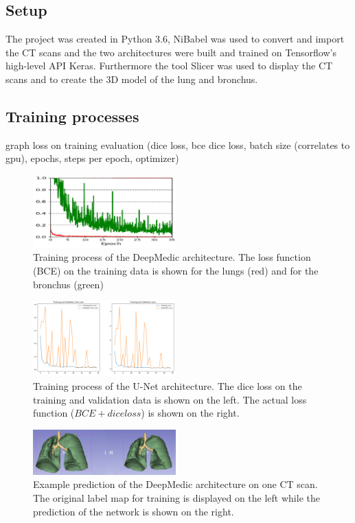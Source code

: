 
\subsection{Setup}

The project was created in Python 3.6, NiBabel was used to convert and import the CT scans and the two architectures were built and trained on Tensorflow's high-level API Keras. Furthermore the tool Slicer was used to display the CT scans and to create the 3D model of the lung and bronchus.

\subsection{Training processes}
graph loss on training evaluation (dice loss, bce dice loss, batch size (correlates to gpu), epochs, steps per epoch, optimizer)

\begin{figure}[h!]
	\includegraphics[width=0.49\textwidth, angle=0]{files/deepmedictrain.png}
	\caption{Training process of the DeepMedic architecture. The loss function (BCE) on the training data is shown for the lungs (red) and for the bronchus (green)}
	\label{train_deepmedic}
\end{figure}


\begin{figure}[h!]
	\includegraphics[width=0.49\textwidth, angle=0]{files/jpgunettrain.png}
	\caption{Training process of the U-Net architecture. The dice loss on the training and validation data is shown on the left. The actual loss function ($BCE + dice loss$) is shown on the right.}
	\label{train_unet}
\end{figure}

\begin{figure}[h!]
	\includegraphics[width=0.49\textwidth, angle=0]{files/preddeepmedic.png}
	\caption{Example prediction of the DeepMedic architecture on one CT scan. The original label map for training is displayed on the left while the prediction of the network is shown on the right.}
	\label{pred_deepmedic}
\end{figure}


